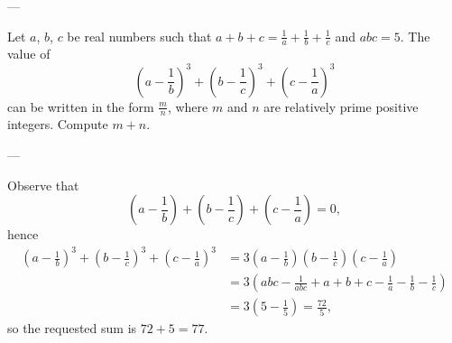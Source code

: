
---

Let $a$, $b$, $c$ be real numbers such that $a+b+c=\frac1a+\frac1b+\frac1c$ and $abc=5$. The value of
\[\left(a-\frac1b\right)^3+\left(b-\frac1c\right)^3+\left(c-\frac1a\right)^3\]
can be written in the form $\frac mn$, where $m$ and $n$ are relatively prime positive integers. Compute $m+n$.

---

Observe that
\[\left(a-\frac1b\right)+\left(b-\frac1c\right)+\left(c-\frac1a\right)=0,\]
hence
\begin{align*}
\left(a-\frac1b\right)^3+\left(b-\frac1c\right)^3+\left(c-\frac1a\right)^3
&=3\left(a-\frac1b\right)\left(b-\frac1c\right)\left(c-\frac1a\right)\\
&=3\left(abc-\frac1{abc}+a+b+c-\frac1a-\frac1b-\frac1c\right)\\
&=3\left(5-\frac15\right)=\frac{72}5,
\end{align*}
so the requested sum is $72+5=77$.
